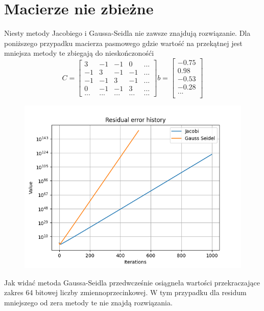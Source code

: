 \documentclass{article}
\begin{document}
\section{Macierze nie zbieżne}
Niesty metody Jacobiego i Gaussa-Seidla nie zawsze znajdują rozwiązanie. Dla poniższego przypadku macierza pasmowego gdzie wartość na przekątnej jest mniejsza metody te zbiegają do nieskończonośći
\[
C  =
\begin{bmatrix}
3 & -1    & -1    & 0     & ...  \\
-1    & 3  & -1    & -1    & ...  \\
-1    & -1    & 3 & -1    & ...  \\        
0    & -1    & -1     & 3 & ...  \\   
...  &  ...  & ...    & ...   & ...  
\end{bmatrix}
b = 
\begin{bmatrix}
-0.75 \\
0.98 \\
-0.53 \\
-0.28 \\
... \\
\end{bmatrix}
\]
\begin{figure}[H]
    \centering
    \includegraphics[width=1\linewidth]{figure1.png}
\end{figure}

Jak widać metoda Gaussa-Seidla przedwcześnie osiągneła 
wartości przekraczające zakres 64 bitowej 
liczby zmiennoprzecinkowej. 
W tym przypadku dla residum mniejszego od zera metody te nie znajdą rozwiązania. 
\end{document}
